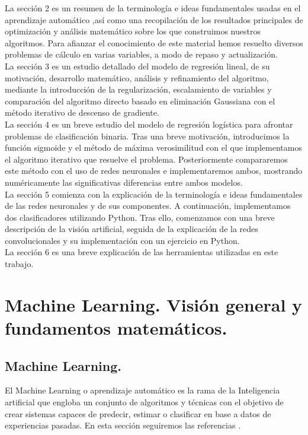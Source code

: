 \documentclass[a4paper,11pt]{article}
\begin{document}
\noindent
La sección 2 es un resumen de la terminología e ideas fundamentales usadas en
el aprendizaje automático ,así como una recopilación de los resultados principales
de optimización y análisis matemático sobre los que construimos nuestros algoritmos. Para afianzar el conocimiento de este material hemos resuelto diversos
problemas de cálculo en varias variables, a modo de repaso y actualización.\\

\noindent
La sección 3 es un estudio detallado del modelo de regresión lineal, de su motivación, desarrollo matemático, análisis y refinamiento del algoritmo, mediante
la introducción de la regularización, escalamiento de variables y comparación del
algoritmo directo basado en eliminación Gaussiana con el método iterativo de
descenso de gradiente.\\

\noindent
La sección 4 es un breve estudio del modelo de regresión logística para afrontar
problemas de clasificación binaria. Tras una breve motivación, introducimos la
función sigmoide y el método de máxima verosimilitud con el que implementamos
el algoritmo iterativo que resuelve el problema. Posteriormente compararemos
este método con el uso de redes neuronales e implementaremos ambos, mostrando
numéricamente las significativas diferencias entre ambos modelos.\\

\noindent
La sección 5 comienza con la explicación de la terminología e ideas fundamentales de las redes neuronales y de sus componentes. A continuación, implementamos dos clasificadores utilizando Python. Tras ello, comenzamos con una breve descripción de la visión artificial, seguida de la explicación de la redes convolucionales y su implementación con un ejercicio en Python.\\

\noindent
La sección 6 es una breve explicación de las herramientas utilizadas en este trabajo.


\newpage
\section{Machine Learning. Visión general y fundamentos matemáticos.}

\subsection{Machine Learning.}
El Machine Learning o aprendizaje automático es la rama de la Inteligencia artificial que engloba un conjunto de algoritmos y técnicas con el objetivo de crear sistemas capaces de predecir, estimar o clasificar en base a datos de experiencias pasadas. En esta sección seguiremos las referencias \cite{andrew} \cite{redes}.\\
\end{document}
